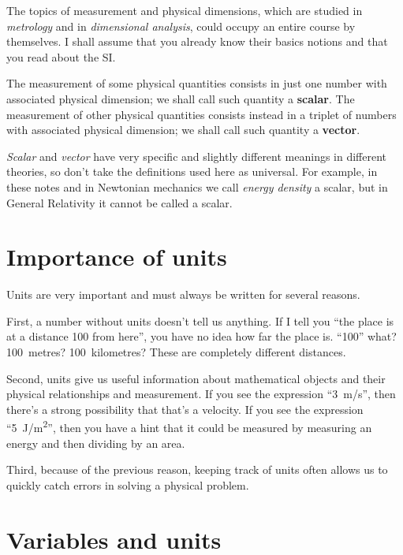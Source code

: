 \documentclass[a4paper,12pt,%
onecolumn,oneside,%
british%
]{memoir}
\renewcommand*{\|}[1][]{\nonscript\:#1\vert\nonscript\:\mathopen{}}
\begin{document}
The topics of measurement and physical dimensions, which are studied in \emph{metrology} and in \emph{dimensional analysis}, could occupy an entire course by themselves. I shall assume that you already know their basics notions and that you read about the SI.

\smallskip

The measurement of some physical quantities consists in just one number with associated physical dimension; we shall call such quantity a \textbf{scalar}. The measurement of other physical quantities consists instead in a triplet of numbers with associated physical dimension; we shall call such quantity a \textbf{vector}.
\begin{warning}
  \emph{Scalar} and \emph{vector} have very specific and slightly different meanings in different theories, so don't take the definitions used here as universal. For example, in these notes and in Newtonian mechanics we call \emph{energy density} a scalar, but in General Relativity it cannot be called a scalar.
\end{warning}

\section{Importance of units}
\label{sec:importance_units}

Units are very important and must always be written for several reasons.

First, a number without units doesn't tell us anything. If I tell you \enquote{the place is at a distance 100 from here}, you have no idea how far the place is. \enquote{100} what? 100~metres? 100~kilometres? These are completely different distances.

Second, units give us useful information about mathematical objects and their physical relationships and measurement. If you see the expression \enquote{\qty{3}{m/s}}, then there's a strong possibility that that's a velocity. If you see the expression \enquote{\qty{5}{J/m^2}}, then you have a hint that it could be measured by measuring an energy and then dividing by an area.

Third, because of the previous reason, keeping track of units often allows us to quickly catch errors in solving a physical problem.

\section{Variables and units}
\label{sec:variables_units}
\end{document}
